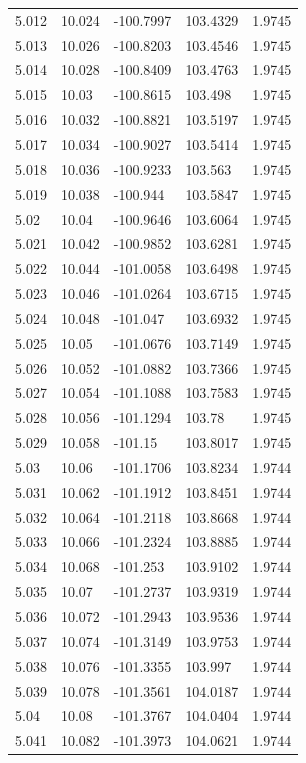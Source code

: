 \begin{tabular}{lllll}
5.012 & 10.024 & -100.7997 & 103.4329 & 1.9745 \\
5.013 & 10.026 & -100.8203 & 103.4546 & 1.9745 \\
5.014 & 10.028 & -100.8409 & 103.4763 & 1.9745 \\
5.015 & 10.03 & -100.8615 & 103.498 & 1.9745 \\
5.016 & 10.032 & -100.8821 & 103.5197 & 1.9745 \\
5.017 & 10.034 & -100.9027 & 103.5414 & 1.9745 \\
5.018 & 10.036 & -100.9233 & 103.563 & 1.9745 \\
5.019 & 10.038 & -100.944 & 103.5847 & 1.9745 \\
5.02 & 10.04 & -100.9646 & 103.6064 & 1.9745 \\
5.021 & 10.042 & -100.9852 & 103.6281 & 1.9745 \\
5.022 & 10.044 & -101.0058 & 103.6498 & 1.9745 \\
5.023 & 10.046 & -101.0264 & 103.6715 & 1.9745 \\
5.024 & 10.048 & -101.047 & 103.6932 & 1.9745 \\
5.025 & 10.05 & -101.0676 & 103.7149 & 1.9745 \\
5.026 & 10.052 & -101.0882 & 103.7366 & 1.9745 \\
5.027 & 10.054 & -101.1088 & 103.7583 & 1.9745 \\
5.028 & 10.056 & -101.1294 & 103.78 & 1.9745 \\
5.029 & 10.058 & -101.15 & 103.8017 & 1.9745 \\
5.03 & 10.06 & -101.1706 & 103.8234 & 1.9744 \\
5.031 & 10.062 & -101.1912 & 103.8451 & 1.9744 \\
5.032 & 10.064 & -101.2118 & 103.8668 & 1.9744 \\
5.033 & 10.066 & -101.2324 & 103.8885 & 1.9744 \\
5.034 & 10.068 & -101.253 & 103.9102 & 1.9744 \\
5.035 & 10.07 & -101.2737 & 103.9319 & 1.9744 \\
5.036 & 10.072 & -101.2943 & 103.9536 & 1.9744 \\
5.037 & 10.074 & -101.3149 & 103.9753 & 1.9744 \\
5.038 & 10.076 & -101.3355 & 103.997 & 1.9744 \\
5.039 & 10.078 & -101.3561 & 104.0187 & 1.9744 \\
5.04 & 10.08 & -101.3767 & 104.0404 & 1.9744 \\
5.041 & 10.082 & -101.3973 & 104.0621 & 1.9744 \\

\end{tabular}
